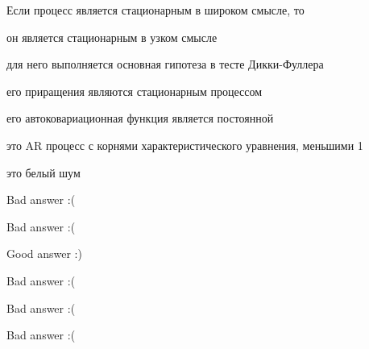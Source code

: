 
\begin{question}
Если процесс является стационарным в широком смысле, то
\begin{answerlist}
  \item он является стационарным в узком смысле
  \item для него выполняется основная гипотеза в тесте Дикки-Фуллера
  \item его приращения являются стационарным процессом
  \item его автоковариационная функция является постоянной
  \item это AR процесс с корнями характеристического уравнения, меньшими 1
  \item это белый шум
\end{answerlist}
\end{question}

\begin{solution}
\begin{answerlist}
  \item Bad answer :(
  \item Bad answer :(
  \item Good answer :)
  \item Bad answer :(
  \item Bad answer :(
  \item Bad answer :(
\end{answerlist}
\end{solution}

